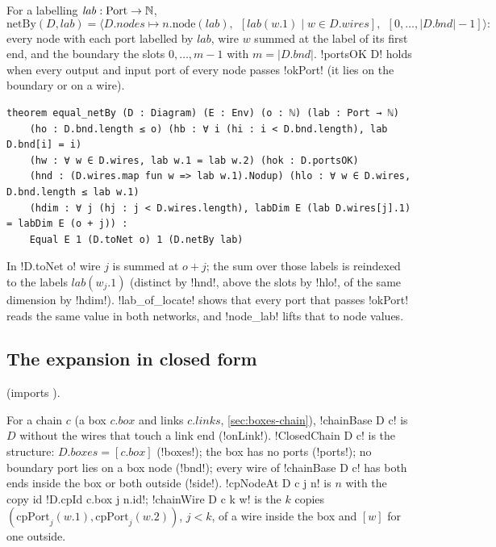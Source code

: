 {\begin{definition}\label{def:boxes-netBy}
For a labelling $\mathit{lab}:\mathrm{Port}\to\mathbb{N}$,
\[
\mathrm{netBy}(D,\mathit{lab})=\bigl\langle D.\mathit{nodes}\mapsto n.\mathrm{node}(\mathit{lab}),\ \ [\mathit{lab}(w.1)\mid w\in D.\mathit{wires}],\ \ [0,\ldots,|D.\mathit{bnd}|-1]\bigr\rangle:
\]
every node with each port labelled by $\mathit{lab}$, wire $w$ summed at the label of its first end, and the boundary the slots $0,\ldots,m-1$ with $m=|D.\mathit{bnd}|$. \lbx!portsOK D! holds when every output and input port of every node passes \lbx!okPort! (it lies on the boundary or on a wire).
\end{definition}

\begin{theorem}\label{thm:boxes-equal-netBy}
\begin{lstlisting}[style=leanbox]
theorem equal_netBy (D : Diagram) (E : Env) (o : ℕ) (lab : Port → ℕ)
    (ho : D.bnd.length ≤ o) (hb : ∀ i (hi : i < D.bnd.length), lab D.bnd[i] = i)
    (hw : ∀ w ∈ D.wires, lab w.1 = lab w.2) (hok : D.portsOK)
    (hnd : (D.wires.map fun w => lab w.1).Nodup) (hlo : ∀ w ∈ D.wires, D.bnd.length ≤ lab w.1)
    (hdim : ∀ j (hj : j < D.wires.length), labDim E (lab D.wires[j].1) = labDim E (o + j)) :
    Equal E 1 (D.toNet o) 1 (D.netBy lab)
\end{lstlisting}
\end{theorem}
\noindent In \lbx!D.toNet o! wire $j$ is summed at $o+j$; the sum over those labels is reindexed to the labels $\mathit{lab}(w_j.1)$ (distinct by \lbx!hnd!, above the slots by \lbx!hlo!, of the same dimension by \lbx!hdim!). \lbx!lab_of_locate! shows that every port that passes \lbx!okPort! reads the same value in both networks, and \lbx!node_lab! lifts that to node values.

\subsection{The expansion in closed form}

 (imports ).

\begin{definition}\label{def:boxes-closedchain}
For a chain $c$ (a box $c.\mathit{box}$ and links $c.\mathit{links}$, \cref{sec:boxes-chain}), \lbx!chainBase D c! is $D$ without the wires that touch a link end (\lbx!onLink!). \lbx!ClosedChain D c! is the structure: $D.\mathit{boxes}=[c.\mathit{box}]$ (\lbx!boxes!); the box has no ports (\lbx!ports!); no boundary port lies on a box node (\lbx!bnd!); every wire of \lbx!chainBase D c! has both ends inside the box or both outside (\lbx!side!). \lbx!cpNodeAt D c j n! is $n$ with the copy id \lbx!D.cpId c.box j n.id!; \lbx!chainWire D c k w! is the $k$ copies $(\mathrm{cpPort}_j(w.1),\mathrm{cpPort}_j(w.2))$, $j<k$, of a wire inside the box and $[w]$ for one outside.
\end{definition}

}
